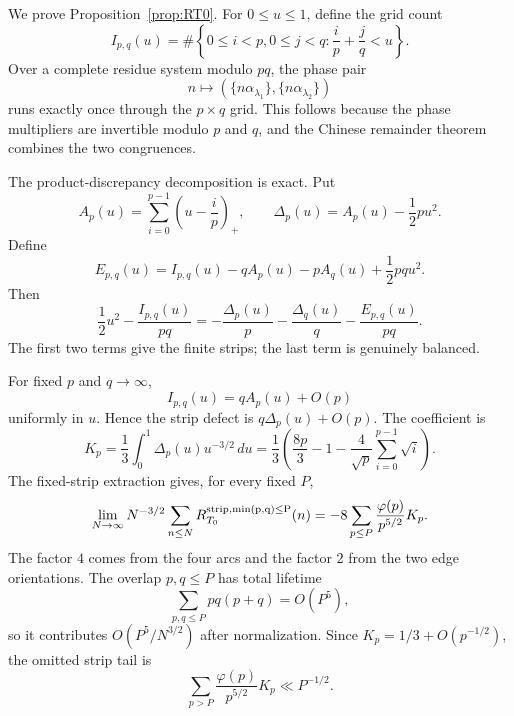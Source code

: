 \documentclass[a4paper,american,11pt]{amsart}
\theoremstyle{plain}
\theoremstyle{definition}
\newcommand{\dd}{\,d}
\begin{document}
We prove Proposition~\ref{prop:RT0}.  For \(0\le u\le1\), define the grid
count
\begin{equation}\label{eq:IpqCount}
 I_{p,q}(u)=\#\left\{0\le i<p,
 0\le j<q:
 \frac{i}{p}+\frac{j}{q}<u\right\}.
\end{equation}
Over a complete residue system modulo \(pq\), the phase pair
\[
 n\mapsto (\{n\alpha_{\lambda_1}\},\{n\alpha_{\lambda_2}\})
\]
runs exactly once through the \(p\times q\) grid.  This follows because the
phase multipliers are invertible modulo \(p\) and \(q\), and the Chinese
remainder theorem combines the two congruences.

The product-discrepancy decomposition is exact.  Put
\[
 A_p(u)=\sum_{i=0}^{p-1}\left(u-\frac{i}{p}\right)_+,
 \qquad
 \Delta_p(u)=A_p(u)-\frac12pu^2.
\]
Define
\begin{equation}\label{eq:EpqT0}
 E_{p,q}(u)=I_{p,q}(u)-qA_p(u)-pA_q(u)+\frac12pqu^2.
\end{equation}
Then
\begin{equation}\label{eq:T0decomp}
 \frac12u^2-\frac{I_{p,q}(u)}{pq}
 =-\frac{\Delta_p(u)}p-\frac{\Delta_q(u)}q-\frac{E_{p,q}(u)}{pq}.
\end{equation}
The first two terms give the finite strips; the last term is genuinely
balanced.

For fixed \(p\) and \(q\to\infty\),
\[
 I_{p,q}(u)=qA_p(u)+O(p)
\]
uniformly in \(u\).  Hence the strip defect is \(q\Delta_p(u)+O(p)\).  The
coefficient is
\begin{equation}\label{eq:KpIntegral}
 K_p=\frac13\int_0^1\Delta_p(u)u^{-3/2}\dd u
 =\frac13\left(\frac{8p}{3}-1-\frac4{\sqrt p}\sum_{i=0}^{p-1}\sqrt i\right).
\end{equation}
The fixed-strip extraction gives, for every fixed \(P\),
\begin{equation}\label{eq:FST0}
 \lim_{N\to\infty}N^{-3/2}\sum_{n\le N}R^{\rm strip,\min(p,q)\le P}_{T_0}(n)
 =-8\sum_{p\le P}\frac{\varphi(p)}{p^{5/2}}K_p.
\end{equation}
The factor \(4\) comes from the four arcs and the factor \(2\) from the two
edge orientations.  The overlap \(p,q\le P\) has total lifetime
\[
 \sum_{p,q\le P}pq(p+q)=O(P^5),
\]
so it contributes \(O(P^5/N^{3/2})\) after normalization.  Since
\(K_p=1/3+O(p^{-1/2})\), the omitted strip tail is
\[
 \sum_{p>P}\frac{\varphi(p)}{p^{5/2}}K_p\ll P^{-1/2}.
\]
\end{document}
